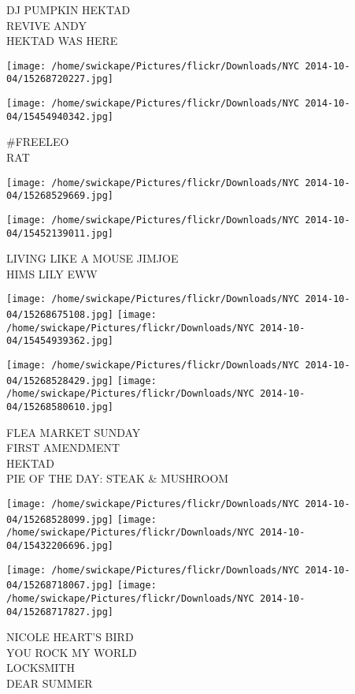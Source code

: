 \documentclass[10pt,letterpaper]{article}
\begin{document}
DJ PUMPKIN HEKTAD\\
REVIVE ANDY\\
HEKTAD WAS HERE\\
\pagebreak

\texttt{[image: /home/swickape/Pictures/flickr/Downloads/NYC 2014-10-04/15268720227.jpg]}

\vspace{0.25in}
\texttt{[image: /home/swickape/Pictures/flickr/Downloads/NYC 2014-10-04/15454940342.jpg]}

\#FREELEO\\
RAT\\
\pagebreak

\texttt{[image: /home/swickape/Pictures/flickr/Downloads/NYC 2014-10-04/15268529669.jpg]}

\vspace{0.25in}
\texttt{[image: /home/swickape/Pictures/flickr/Downloads/NYC 2014-10-04/15452139011.jpg]}

LIVING LIKE A MOUSE JIMJOE\\
HIMS LILY EWW\\
\pagebreak

\texttt{[image: /home/swickape/Pictures/flickr/Downloads/NYC 2014-10-04/15268675108.jpg]}
\texttt{[image: /home/swickape/Pictures/flickr/Downloads/NYC 2014-10-04/15454939362.jpg]}

\texttt{[image: /home/swickape/Pictures/flickr/Downloads/NYC 2014-10-04/15268528429.jpg]}
\texttt{[image: /home/swickape/Pictures/flickr/Downloads/NYC 2014-10-04/15268580610.jpg]}

FLEA MARKET SUNDAY\\
FIRST AMENDMENT\\
HEKTAD\\
PIE OF THE DAY: STEAK \& MUSHROOM\\
\pagebreak

\texttt{[image: /home/swickape/Pictures/flickr/Downloads/NYC 2014-10-04/15268528099.jpg]}
\texttt{[image: /home/swickape/Pictures/flickr/Downloads/NYC 2014-10-04/15432206696.jpg]}

\texttt{[image: /home/swickape/Pictures/flickr/Downloads/NYC 2014-10-04/15268718067.jpg]}
\texttt{[image: /home/swickape/Pictures/flickr/Downloads/NYC 2014-10-04/15268717827.jpg]}

NICOLE HEART'S BIRD\\
YOU ROCK MY WORLD\\
LOCKSMITH\\
DEAR SUMMER\\
\pagebreak
\end{document}
